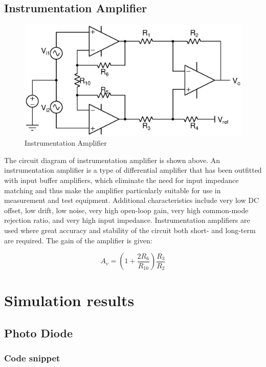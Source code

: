 \documentclass[12pt]{article}
\begin{document}
\subsection*{Instrumentation Amplifier}

\begin{figure}[H]
    \centering
    \includegraphics{instrumentation.eps}
    \caption{Instrumentation Amplifier}
\end{figure}
The circuit diagram of instrumentation amplifier is shown above. \newline 
An instrumentation amplifier is a type of differential amplifier that has been outfitted with input buffer amplifiers, which eliminate the need for input impedance matching and thus make the amplifier particularly suitable for use in measurement and test equipment. \newline
Additional characteristics include very low DC offset, low drift, low noise, very high open-loop gain, very high common-mode rejection ratio, and very high input impedance. Instrumentation amplifiers are used where great accuracy and stability of the circuit both short- and long-term are required.
\newline
The gain of the amplifier is given:

\begin{equation}
    A_{v}=\left(1+\frac{2R_{6}}{R_{10}}\right)\frac{R_3}{R_2}
\end{equation}

\section{Simulation results}

\subsection{Photo Diode}
\subsubsection{Code snippet}


\end{document}
